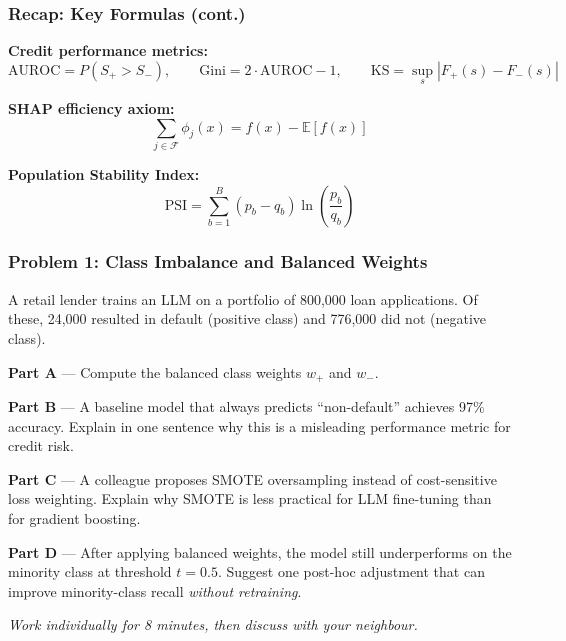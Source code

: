 \documentclass[9pt,t]{beamer}
\begin{document}
\begin{frame}
\frametitle{Recap: Key Formulas (cont.)}

\textbf{Credit performance metrics:}
\[
  \text{AUROC} = P(S_+ > S_-), \qquad
  \text{Gini} = 2 \cdot \text{AUROC} - 1, \qquad
  \text{KS} = \sup_s |F_+(s) - F_-(s)|
\]

\textbf{SHAP efficiency axiom:}
\[
  \sum_{j \in \mathcal{F}} \phi_j(x) = f(x) - \mathbb{E}[f(x)]
\]

\textbf{Population Stability Index:}
\[
  \text{PSI} = \sum_{b=1}^{B} (p_b - q_b) \ln\!\left(\frac{p_b}{q_b}\right)
\]
\end{frame}

\begin{frame}
\frametitle{Problem 1: Class Imbalance and Balanced Weights}

A retail lender trains an LLM on a portfolio of 800,000 loan applications. Of these, 24,000 resulted in default (positive class) and 776,000 did not (negative class).

\medskip
\textbf{Part A} --- Compute the balanced class weights $w_+$ and $w_-$.

\medskip
\textbf{Part B} --- A baseline model that always predicts ``non-default'' achieves 97\% accuracy. Explain in one sentence why this is a misleading performance metric for credit risk.

\medskip
\textbf{Part C} --- A colleague proposes SMOTE oversampling instead of cost-sensitive loss weighting. Explain why SMOTE is less practical for LLM fine-tuning than for gradient boosting.

\medskip
\textbf{Part D} --- After applying balanced weights, the model still underperforms on the minority class at threshold $t = 0.5$. Suggest one post-hoc adjustment that can improve minority-class recall \emph{without retraining}.

\medskip
\begin{center}
\small\textit{Work individually for 8 minutes, then discuss with your neighbour.}
\end{center}
\end{frame}
\end{document}
